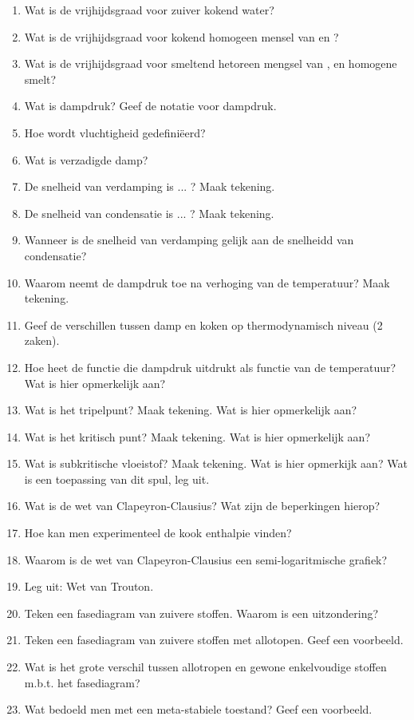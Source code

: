 \documentclass[a4paper,12pt]{article}
\begin{document}
\begin{enumerate}
        \item Wat is de vrijhijdsgraad voor zuiver kokend water?
        \item Wat is de vrijhijdsgraad voor kokend homogeen mensel van  en ?
        \item Wat is de vrijhijdsgraad voor smeltend hetoreen mengsel van  ,  en homogene smelt?
        \item Wat is dampdruk? Geef de notatie voor dampdruk.
        \item Hoe wordt vluchtigheid gedefini\"eerd?
        \item Wat is verzadigde damp?
        \item De snelheid van verdamping is ... ? Maak tekening.
        \item De snelheid van condensatie is ... ? Maak tekening.
        \item Wanneer is de snelheid van verdamping gelijk aan de snelheidd van condensatie?
        \item Waarom neemt de dampdruk toe na verhoging van de temperatuur? Maak tekening.
        \item Geef de verschillen tussen damp en koken op thermodynamisch niveau (2 zaken).
        \item Hoe heet de functie die dampdruk uitdrukt als functie van de temperatuur? Wat is hier opmerkelijk aan?
        \item Wat is het tripelpunt? Maak tekening. Wat is hier opmerkelijk aan?
        \item Wat is het kritisch punt? Maak tekening. Wat is hier opmerkelijk aan?
        \item Wat is subkritische vloeistof? Maak tekening. Wat is hier opmerkijk aan? Wat is een toepassing van dit spul, leg uit.
        \item Wat is de wet van Clapeyron-Clausius? Wat zijn de beperkingen hierop? 
        \item Hoe kan men experimenteel de kook enthalpie vinden?
        \item Waarom is de wet van Clapeyron-Clausius een semi-logaritmische grafiek?
        \item Leg uit: Wet van Trouton.
        \item Teken een fasediagram van zuivere stoffen. Waarom is  een uitzondering?
        \item Teken een fasediagram van zuivere stoffen met allotopen. Geef een voorbeeld.
        \item Wat is het grote verschil tussen allotropen en gewone enkelvoudige stoffen m.b.t. het fasediagram?
        \item Wat bedoeld men met een meta-stabiele toestand? Geef een voorbeeld.
    \end{enumerate}
\end{document}
